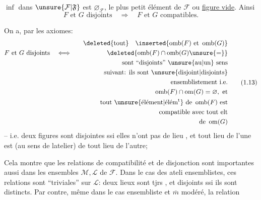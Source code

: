 $\inf$ dans $\unsure{\mathcal{F}|\mathfrak{F}}$ est $\varnothing_{\mathcal{F}}$, le plus petit élément de $\mathcal{F}$ ou \uline{figure vide}. Ainsi
\[
F\text{ et }G\text{ disjoints}\quad\Longrightarrow\quad F\text{ et }G\text{ compatibles}.
\]

On a, par les axiomes:
\[
\begin{aligned}
&&\deleted{\text{tout}}\quad\inserted{\operatorname{omb}(F)\text{ et }\operatorname{omb}(G)}\\
F\text{ et }G\text{ disjoints}&\quad\Longleftrightarrow\quad&\deleted{\operatorname{omb}(F)\cap\operatorname{omb}(G)\unsure{=}}\\
&&\text{sont ``disjoints'' \unsure{au|un} sens}\\
&&\text{suivant: ils sont \unsure{disjoint|disjoints}}\\
&&\text{ensemblistement i.e.}\\
&&\operatorname{omb}(F)\cap\operatorname{om}(G)=\varnothing,\ \text{et}\\
&&\text{tout \unsure{élément|élém\textsuperscript{t}} de }\operatorname{omb}(F)\text{ est}\\
&&\text{compatible avec tout elt}\\
&&\text{de }\operatorname{om}(G)
\end{aligned}\tag*{(1.13)}
\]
-- i.e. deux figures sont disjointes ssi elles n'ont pas de lieu , et tout lieu de l'une est   (au sens de latelier) de tout lieu de l'autre;

Cela montre que les relations de compatibilité et de disjonction sont importantes aussi dans les  ensembles $\mathcal{M},\mathcal{L}$ de $\mathcal{F}$. Dans le cas des ateli ensemblistes, ces relations sont ``triviales'' sur $\mathcal{L}$: deux lieux sont tjrs  , et disjoints ssi ils sont distincts. Par contre, même dans le cas ensembliste et $\overline m$ modéré, la relation
